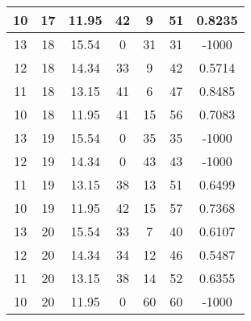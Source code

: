 \documentclass[letterpaper, 12pt]{article}
\begin{document}
\begin{longtable}{|c|c|c|c|c|c|c|}
10 & 17 & 11.95 & 42 & 9 & 51 & 0.8235 \\
\hline
13 & 18 & 15.54 & 0 & 31 & 31 & -1000 \\
\hline
12 & 18 & 14.34 & 33 & 9 & 42 & 0.5714 \\
\hline
11 & 18 & 13.15 & 41 & 6 & 47 & 0.8485 \\
\hline
10 & 18 & 11.95 & 41 & 15 & 56 & 0.7083 \\
\hline
13 & 19 & 15.54 & 0 & 35 & 35 & -1000 \\
\hline
12 & 19 & 14.34 & 0 & 43 & 43 & -1000 \\
\hline
11 & 19 & 13.15 & 38 & 13 & 51 & 0.6499 \\
\hline
10 & 19 & 11.95 & 42 & 15 & 57 & 0.7368 \\
\hline
13 & 20 & 15.54 & 33 & 7 & 40 & 0.6107 \\
\hline
12 & 20 & 14.34 & 34 & 12 & 46 & 0.5487 \\
\hline
11 & 20 & 13.15 & 38 & 14 & 52 & 0.6355 \\
\hline
10 & 20 & 11.95 & 0 & 60 & 60 & -1000 \\
\hline
\end{longtable}
\end{document}
